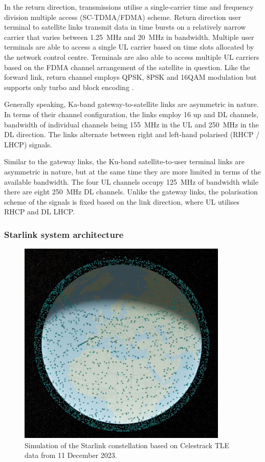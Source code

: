 \documentclass[english, 12pt, a4paper, elec, utf8, a-1b, online]{aaltothesis}
\begin{document}
In the return direction, transmissions utilise a single-carrier time and frequency division multiple access (SC-TDMA/FDMA) scheme.
Return direction user terminal to satellite links transmit data in time bursts on a relatively narrow carrier that varies between \SI{1.25}{\mega\hertz} and \SI{20}{\mega\hertz} in bandwidth.
Multiple user terminals are able to access a single UL carrier based on time slots allocated by the network control centre.
Terminals are also able to access multiple UL carriers based on the FDMA channel arrangement of the satellite in question. Like the forward link,
return channel employs QPSK, 8PSK and 16QAM modulation but supports only turbo and block encoding \cite{worldvu2016loi}.

Generally speaking, Ka-band gateway-to-satellite links are asymmetric in nature. In terms of their channel configuration, the links employ 16 up and DL channels, bandwidth of individual channels being \SI{155}{\mega\hertz} in the UL and \SI{250}{\mega\hertz} in the DL direction. The links alternate between right and left-hand polarised (RHCP / LHCP) signals. \cite{portillo2019technical}

Similar to the gateway links, the Ku-band satellite-to-user terminal links are asymmetric in nature, but at the same time they are more limited in terms of the available bandwidth. The four UL channels occupy \SI{125}{\mega\hertz} of bandwidth while there are eight \SI{250}{\mega\hertz} DL channels. Unlike the gateway links, the polarisation scheme of the signals is fixed based on the link direction, where UL utilises RHCP and DL LHCP. \cite{portillo2019technical}

\subsubsection{Starlink system architecture}

\begin{figure}[h]
  \centering
  \includegraphics[width=100mm]{figures/starlink-tle-2023-12-11-compressed.jpg}
  \caption{Simulation of the Starlink constellation based on Celestrack TLE data from 11 December 2023.}
  \label{fig-starlink-tle-2023-12-11}
\end{figure}
\end{document}
